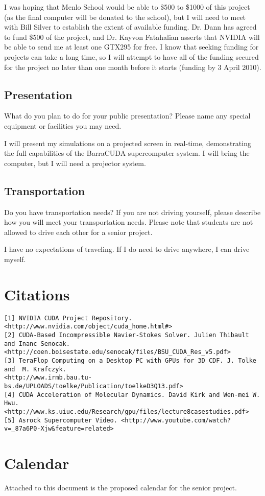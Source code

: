 \documentclass[10pt]{article}
\begin{document}
I was hoping that Menlo School would be able to \$500 to \$1000 of this project (as the final computer will be donated to the school), but I will need to meet with Bill Silver to establish the extent of available funding. Dr. Dann has agreed to fund \$500 of the project, and Dr. Kayvon Fatahalian asserts that NVIDIA will be able to send me at least one GTX295 for free. I know that seeking funding for projects can take a long time, so I will attempt to have all of the funding secured for the project no later than one month before it starts (funding by 3 April 2010).

\subsection{Presentation}
What do you plan to do for your public presentation? Please name any special equipment or facilities you may need.

I will present my simulations on a projected screen in real-time, demonstrating the full capabilities of the BarraCUDA supercomputer system. I will bring the computer, but I will need a projector system.

\subsection{Transportation}
Do you have transportation needs? If you are not driving yourself, please describe how you will meet your transportation needs. Please note that students are not allowed to drive each other for a senior project.

I have no expectations of traveling. If I do need to drive anywhere, I can drive myself.

\section{Citations}
\begin{verbatim}
[1] NVIDIA CUDA Project Repository. 
<http://www.nvidia.com/object/cuda_home.html#>
[2] CUDA-Based Incompressible Navier-Stokes Solver. Julien Thibault and Inanc Senocak. 
<http://coen.boisestate.edu/senocak/files/BSU_CUDA_Res_v5.pdf>
[3] TeraFlop Computing on a Desktop PC with GPUs for 3D CDF. J. Tolke and  M. Krafczyk.  
<http://www.irmb.bau.tu-bs.de/UPLOADS/toelke/Publication/toelkeD3Q13.pdf>
[4] CUDA Acceleration of Molecular Dynamics. David Kirk and Wen-mei W. Hwu. 
<http://www.ks.uiuc.edu/Research/gpu/files/lecture8casestudies.pdf>
[5] Asrock Supercomputer Video. <http://www.youtube.com/watch?v=_87a6P0-Xjw&feature=related>
\end{verbatim}

\section{Calendar}
Attached to this document is the proposed calendar for the senior project.
\end{document}
